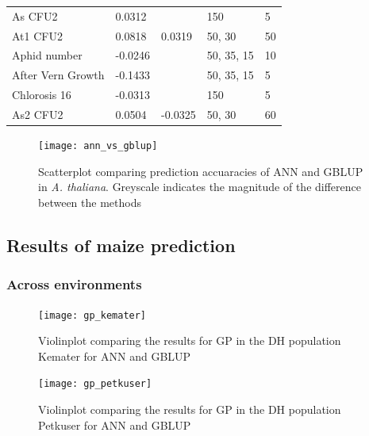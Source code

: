 \begin{longtable}{p{} p{} p{} p{} p{}}
  As CFU2 & 0.0312 & \color{red}{0.035} & 150 & 5 \\
  At1 CFU2 & 0.0818 & 0.0319 & 50, 30 & 50 \\
  Aphid number & -0.0246 & \color{red}{0.029} & 50, 35, 15 & 10 \\
  After Vern Growth & -0.1433 & \color{red}{0.0057} & 50, 35, 15 & 5 \\
  Chlorosis 16 & -0.0313 & \color{red}{-0.0121} & 150 & 5 \\
  As2 CFU2 & 0.0504 & -0.0325 & 50, 30 & 60 \\
\bottomrule
\end{longtable}
\doublespacing



\begin{figure}[H]
 \centering\texttt{[image:  ann\_vs\_gblup]} \decoRule
\caption[Scatterplot comparing prediction accuaracies of ANN and GBLUP in \textit{A. thaliana}]{Scatterplot comparing prediction accuaracies of ANN and GBLUP in \textit{A. thaliana}. Greyscale indicates the magnitude of the difference between the methods}
\label{fig:annblup}
\end{figure}

\subsection{Results of maize prediction}
\subsubsection{Across environments}

\begin{figure}[H]
  \centering \texttt{[image: gp\_kemater]}
  \decoRule
\caption[Violinplot comparing the results for GP in the DH population Kemater for ANN and GBLUP]{Violinplot comparing the results for GP in the DH population Kemater for ANN and GBLUP }
\label{fig:ke_ann}
\end{figure}

\begin{figure}[H]
  \centering \texttt{[image: gp\_petkuser]}
  \decoRule
  \caption[Violinplot comparing the results for GP in the DH population Petkuser for ANN and GBLUP]{Violinplot comparing the results for GP in the DH population Petkuser for ANN and GBLUP }
\label{fig:pe_ann}
\end{figure}


